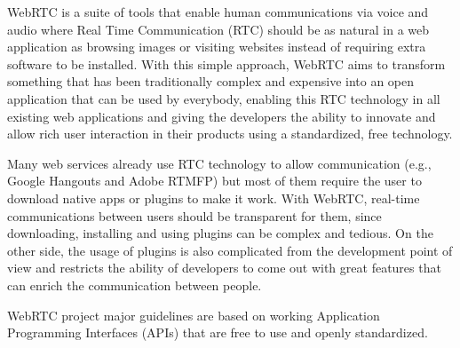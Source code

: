 WebRTC is a suite of tools that enable human communications via voice and audio where Real Time Communication (RTC) should be as natural in a web application as browsing images or visiting websites instead of requiring extra software to be installed. With this simple approach, WebRTC aims to transform something that has been traditionally complex and expensive into an open application that can be used by everybody, enabling this RTC technology in all existing web applications and giving the developers the ability to innovate and allow rich user interaction in their products using a standardized, free technology.

Many web services already use RTC technology to allow communication (e.g., Google Hangouts and Adobe RTMFP) but most of them require the user to download native apps or plugins to make it work. With WebRTC, real-time communications between users should be transparent for them, since downloading, installing and using plugins can be complex and tedious. On the other side, the usage of plugins is also complicated from the development point of view and restricts the ability of developers to come out with great features that can enrich the communication between people.

WebRTC project major guidelines are based on working Application Programming Interfaces (APIs)  that are free to use and openly standardized.


